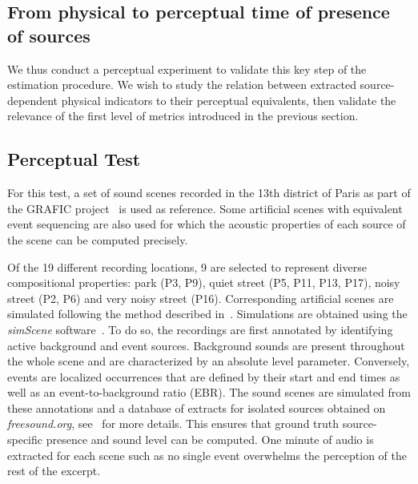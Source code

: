 \documentclass{article}
\begin{document}
\begin{sloppy}
\section{From physical to perceptual time of presence of sources}
\label{sec:val}

We thus conduct a perceptual experiment to validate this key step of the estimation procedure. We wish to study the relation between extracted source-dependent physical indicators to their perceptual equivalents, then validate the relevance of the first level of metrics introduced in the previous section.

\subsection{Perceptual Test}

For this test, a set of sound scenes recorded in the 13th district of Paris as part of the GRAFIC project~\cite{aumond2017} is used as reference. Some artificial scenes with equivalent event sequencing are also used for which the acoustic properties of each source of the scene can be computed precisely.

Of the 19 different recording locations, 9 are selected to represent diverse compositional properties: park (P3, P9), quiet street (P5, P11, P13, P17), noisy street (P2, P6) and very noisy street (P16). Corresponding artificial scenes are simulated following the method described in~\cite{gloaguen2017}. Simulations are obtained using the \textit{simScene} software~\cite{lafay2016}. To do so, the recordings are first annotated by identifying active background and event sources. Background sounds are present throughout the whole scene and are characterized by an absolute level parameter. Conversely, events are localized occurrences that are defined by their start and end times as well as an event-to-background ratio (EBR). The sound scenes are simulated from these annotations and a database of extracts for isolated sources obtained on \textit{freesound.org}, see~\cite{gloaguen2017} for more details. This ensures that ground truth source-specific presence and sound level can be computed. One minute of audio is extracted for each scene such as no single event overwhelms the perception of the rest of the excerpt.


\end{sloppy}
\end{document}
